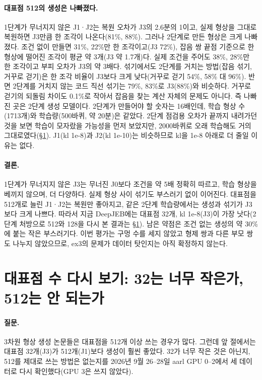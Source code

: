 \documentclass[11pt]{article}
\begin{document}
\paragraph{대표점 512의 생성은 나빠졌다.} 1단계가 무너지지 않은 J1·J2는 복원 오차가 J3의 2.6분의 1이고, 실제 형상을 그대로 복원하면
J3만큼 한 조각이 나온다(81\%, 88\%). 그러나 2단계로 만든 형상은 크게 나빠졌다. 조건 없이 만들면 31\%, 22\%만 한 조각이고(J3 72\%),
잡음 쌍 끝점 기준으로 한 형상에 떨어진 조각이 평균 약 3개(J3 약 1.7개)다. 실제 조건을 주어도 38\%, 28\%만 한 조각이고 부피 오차가 J3의 약 3배다.
섞기에서도 2단계를 거치는 방법(잡음 섞기, 거꾸로 걷기)은 한 조각 비율이 J3보다 크게 낮다(거꾸로 걷기 54\%, 58\% 대 96\%).
반면 2단계를 거치지 않는 코드 직선 섞기는 79\%, 83\%로 J3(88\%)와 비슷하다. 거꾸로 걷기의 되돌림 차이도 0.1\%로 작아서
잡음을 찾는 계산 자체의 문제도 아니다. 즉 나빠진 곳은 2단계 생성 모델이다.
2단계가 만들어야 할 숫자는 16배인데, 학습 형상 수(1713개)와 학습량(500바퀴, 약 20분)은 같았다. 2단계 점검용 오차가 끝까지 내려가던 것을 보면
학습이 모자랐을 가능성을 먼저 보았지만, 2000바퀴로 오래 학습해도 거의 그대로였다(\S\ref{sec:tsize}). J1(kl 1e-8)과 J2(kl 1e-10)는 비슷하므로
kl을 1e-8 아래로 더 줄일 이유는 없다.

\paragraph{결론.} 1단계가 무너지지 않은 J3는 무너진 J0보다 조건을 약 5배 정확히 따르고, 학습 형상을 베끼지 않으며, 더 다양하다.
실제 형상 사이 섞기도 부스러기 없이 이어진다. 대표점을 512개로 늘린 J1·J2는 복원만 좋아지고, 같은 2단계 학습량에서는 생성과 섞기가
J3보다 크게 나쁘다. 따라서 지금 DeepJEB에는 대표점 32개, kl 1e-8(J3)이 가장 낫다(2단계 처방으로 512와 128을 다시 본 결과는 \S\ref{sec:tsize}). 남은 약점은 조건 없는 생성의 약 30\%에 붙는 작은 부스러기다.
이번 평가는 구멍 수를 세지 않았고 형제 쌍과 다른 부모 쌍도 나누지 않았으므로, ex3의 문제가 데이터 탓인지는 아직 확정하지 않는다.

\section{대표점 수 다시 보기: 32는 너무 작은가, 512는 안 되는가}
\label{sec:tsize}

\paragraph{질문.} 3차원 형상 생성 논문들은 대표점을 512개 이상 쓰는 경우가 많다. 그런데 앞 절에서는 대표점 32개(J3)가
512개(J1)보다 생성이 훨씬 좋았다. 32가 너무 작은 것은 아닌지, 512를 제대로 쓰는 방법은 없는지를
2026년 9월 26--28일 aarl GPU 0--2에서 세 데이터로 다시 확인했다(GPU 3은 쓰지 않았다).
\end{document}
